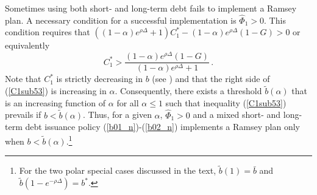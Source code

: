 \documentclass[12pt]{article}
\begin{document}





Sometimes using  both short- and long-term debt fails to implement a Ramsey plan.  
A necessary condition for a successful implementation is 
  $\widehat{\Phi}_1 > 0$. This  condition requires that 
$((1 - \alpha)e^{\rho\Delta} + 1)C_1^* - (1 - \alpha)e^{\rho\Delta}(1 - G) > 0$ or equivalently 
\begin{equation} \label{C1sub53} 
	C_1^* > \frac{(1 - \alpha)e^{\rho\Delta}(1 - G)}{(1 - \alpha)e^{\rho\Delta} + 1} \,.
\end{equation}
Note that $C_1^*$ is strictly decreasing in $b$ (see \citeauthor{debortoli2021optimal}) and  that the right side of (\ref{C1sub53}) is increasing in $\alpha$. Consequently, there exists a  threshold $\tilde{b}(\alpha)$ that  is an increasing function of $\alpha$  for all $\alpha \leq 1$ such that 
inequality (\ref{C1sub53}) prevails if $b < \tilde{b}(\alpha)$. %
Thus, for a given $\alpha$, $\widehat{\Phi}_1 > 0$ and  a mixed short- and long-term debt issuance policy  (\ref{b01_n})-(\ref{b02_n}) implements a Ramsey plan only 
when $b < \tilde{b}(\alpha)$.\footnote{For the two polar special cases discussed in the text, $\tilde{b}(1)=\bar b$ and $\tilde{b}(1-e^{-\rho\Delta})=b^*$.}
\end{document}
